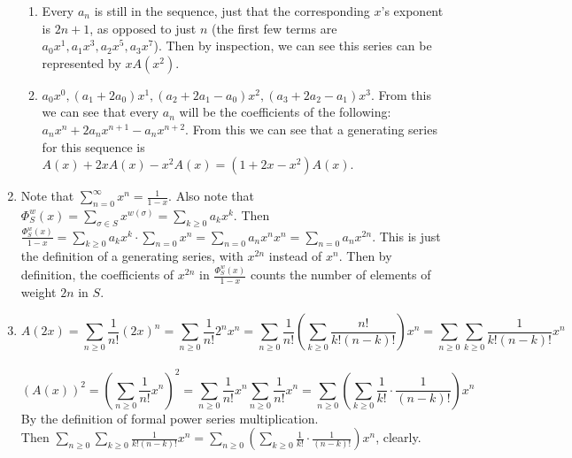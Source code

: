 \documentclass[10pt,english]{article}
\begin{document}
\begin{enumerate}
\begin{enumerate}
    \item Every $a_n$ is still in the sequence, just that the corresponding $x$'s exponent is $2n+1$, as opposed to just $n$ (the first few terms are $a_0x^1,a_1x^3,a_2x^5,a_3x^7$). Then by inspection, we can see this series can be represented by $xA(x^2)$. 
    
    \item $a_0x^0,(a_1+2a_0)x^1,(a_2+2a_1-a_0)x^2,(a_3+2a_2-a_1)x^3$. From this we can see that every $a_n$ will be the coefficients of the following: $a_nx^n+ 2a_nx^{n+1}-a_nx^{n+2}$. From this we can see that a generating series for this sequence is $A(x)+2xA(x)-x^2A(x)=(1+2x-x^2)A(x)$.  
\end{enumerate}

\pagebreak
\item Note that $\sum_{n=0}^\infty x^n=\frac{1}{1-x}$. Also note that $\Phi_S^w(x)=\sum_{\sigma\in S}x^{w(\sigma)}=\sum_{k\geq0}a_kx^k$. Then $\frac{\Phi_S^w(x)}{1-x}=
\sum_{k\geq0}a_kx^k\cdot\sum_{n=0}x^n=\sum_{n=0}a_nx^nx^n=\sum_{n=0}a_nx^{2n}$. This is just the definition of a generating series, with $x^{2n}$ instead of $x^n$. Then by definition, the coefficients of $x^{2n}$ in $\frac{\Phi_S^w(x)}{1-x}$ counts the number of elements of weight $2n$ in $S$. 

\pagebreak
\item $$A(2x)=\sum_{n\geq0}\frac{1}{n!}(2x)^n=\sum_{n\geq0}\frac{1}{n!}2^nx^n=\sum_{n\geq0}\frac{1}{n!}\left(\sum_{k\geq0}\frac{n!}{k!(n-k)!}\right)x^n=\sum_{n\geq0}\sum_{k\geq0}\frac{1}{k!(n-k)!}x^n$$  \\ 
$$(A(x))^2=\left(\sum_{n\geq0}\frac{1}{n!}x^n\right)^2=\sum_{n\geq0}\frac{1}{n!}x^{n}\sum_{n\geq0}\frac{1}{n!}x^{n}=\sum_{n\geq0}\left(\sum_{k\geq0}\frac{1}{k!}\cdot\frac{1}{(n-k)!}\right)x^n$$ By the definition of formal power series multiplication.\\ Then $\sum_{n\geq0}\sum_{k\geq0}\frac{1}{k!(n-k)!}x^n=\sum_{n\geq0}\left(\sum_{k\geq0}\frac{1}{k!}\cdot\frac{1}{(n-k)!}\right)x^n$, clearly. 


\end{enumerate}
\end{document}
